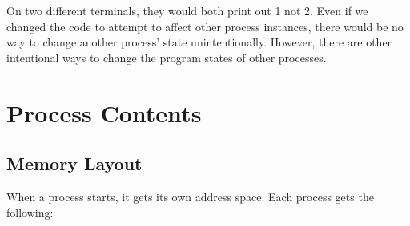 On two different terminals, they would both print out 1 not 2.
Even if we changed the code to attempt to affect other process instances, there would be no way to change another process' state unintentionally.
However, there are other intentional ways to change the program states of other processes.

\section{Process Contents}

\subsection{Memory Layout}

When a process starts, it gets its own address space. Each process gets the following:

